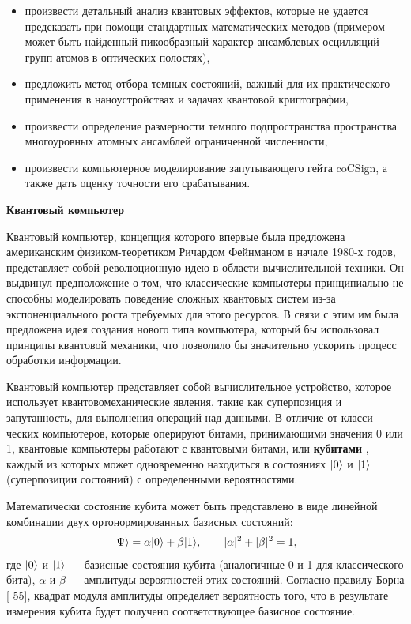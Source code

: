 \begin{itemize}
\item{произвести детальный анализ квантовых эффектов, которые не уда­ется предсказать при помощи стандартных математических методов (примером может быть найденный пикообразный характер ансамбле­вых осцилляций групп атомов в оптических полостях),}
\item{предложить метод отбора темных состояний, важный для их практи­ческого применения в наноустройствах и задачах квантовой криптогра­фии,}
\item{произвести определение размерности темного подпространства про­странства многоуровных атомных ансамблей ограниченной численно­сти,}
\item{произвести компьютерное моделирование запутывающего гейта coCSign, а также дать оценку точности его срабатывания.}
\end{itemize}

\clearpage
\indent\textbf{Квантовый компьютер}

Квантовый компьютер, концепция которого впервые была предложена американским физиком-теоретиком Ричардом Фейнманом \cite{feynman} в начале 1980-х годов, представляет собой революционную идею в области вычислительной техники. Он выдвинул предположение о том, что классические компьютеры принципиально не способны моделировать поведение сложных квантовых си­стем из-за экспоненциального роста требуемых для этого ресурсов. В связи с этим им была предложена идея создания нового типа компьютера, который бы использовал принципы квантовой механики, что позволило бы значительно ускорить процесс обработки информации.

Квантовый компьютер представляет собой вычислительное устройство, которое использует квантовомеханические явления, такие как суперпозиция и запутанность, для выполнения операций над данными. В отличие от класси­ческих компьютеров, которые оперируют битами, принимающими значения 0 или 1, квантовые компьютеры работают с квантовыми битами, или \textbf{кубитами} \cite{valiev_2}, каждый из которых может одновременно находиться в состояниях $|0\rangle$ и $|1\rangle$ (суперпозиции состояний) с определенными вероятностями.

Математически состояние кубита может быть представлено в виде линей­ной комбинации двух ортонормированных базисных состояний:
\begin{align*}
	|\Psi\rangle = \alpha|0\rangle + \beta|1\rangle,\qquad|\alpha|^2 + |\beta|^2 = 1,
\end{align*}
где $|0\rangle$ и $|1\rangle$ --- базисные состояния кубита (аналогичные 0 и 1 для классического бита), $\alpha$ и $\beta$ --- амплитуды вероятностей этих состояний. Согласно правилу Борна [{\color{green} 55}], квадрат модуля амплитуды определяет вероятность того, что в результате измерения кубита будет получено соответствующее базисное состояние.

